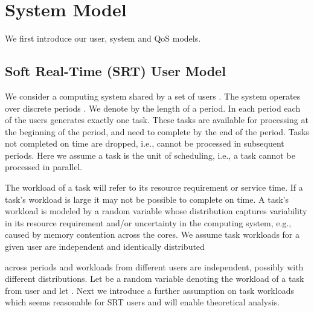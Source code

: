 \documentclass[prodmode,acmtompecs]{acmsmall}
\newcommand{\myComments}[1]{}
\newif\iftompecs
\newif\ifdissertation
\newcommand{\tompecsStart}{\iftompecs \myComments{TOMPECS version: }}
\newcommand{\dissertationStart}{\ifdissertation  \myComments{Dissertation version: }}
\newcommand{\commentEnd}{\myComments{End}}
\begin{document}
\section{System Model}
\label{sec_system_model}
We first introduce our user, system and QoS models. 

\subsection{Soft Real-Time (SRT) User Model}
We consider a computing system shared by a set of users . 
The system operates over discrete periods . We denote by  the length of a period.
In each period each of the  users generates exactly one task. 
These tasks are available for processing at the beginning of the period, and need to complete by the end of the period. 
Tasks not completed on time are dropped, i.e., cannot be processed in subsequent periods. 
Here we assume a task is the unit of scheduling, i.e., a task cannot be processed in parallel. 

\dissertationStart
We consider a system wherein  users indexed from  to  share a centralized computing system. Let  be the user set. 
The system operates in discrete time, over periods . We denote by  the length of a period. 
The users generate streams of tasks periodically. Specifically in each period, each of the  users generates exactly one task. 
These tasks are available for processing, i.e., released, at the beginning of the period, and need to complete by the end of the period. 
Tasks not completed on time are dropped, i.e., cannot be processed in subsequent periods. 
Figure~\ref{figure_task_generation} exhibits the above task generation process. 
Here we assume a task is the unit of scheduling, i.e., a task cannot be processed in parallel on multiple compute resources. 
In the sequel we will discuss generalizations where a task contains dependent sub-tasks. 
\commentEnd\fi

\dissertationStart
\begin{figure}[htp]
  \centering
  \texttt{[image: Figures/task\_generation.pdf]}
  \caption{An example illustrating the task generation model. It shows the start and end points of periods. Each down and up arrow represents the release time and deadline of a task, respectively. }
  \label{figure_task_generation}
\end{figure}
\commentEnd\fi

The workload of a task will refer to its resource requirement or service time. If a task's workload is large it may not be possible to complete on time. 
A task's workload is modeled by a random variable whose distribution captures variability in its resource requirement and/or uncertainty in the computing system, e.g., caused by memory contention across the cores. 
We assume task workloads for a given user are independent and identically distributed 
\tompecsStart
(i.i.d.)
\commentEnd\fi
across periods and workloads from different users are independent, possibly with different distributions. Let  be a random variable denoting the workload of a task from user  and let . 
Next we introduce a further assumption on task workloads which seems reasonable for SRT users and will enable theoretical analysis. 
\end{document}
